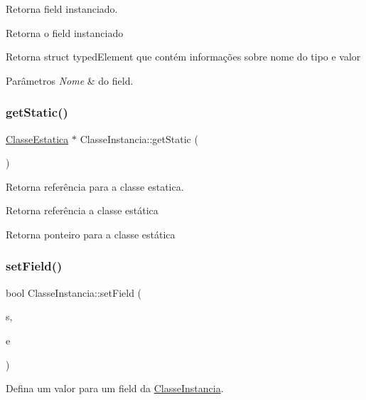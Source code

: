 Retorna field instanciado. 

Retorna o field instanciado \begin{DoxyReturn}{Retorna}
struct typed\+Element que contém informações sobre nome do tipo e valor
\end{DoxyReturn}

\begin{DoxyParams}{Parâmetros}
{\em Nome} & do field. \\
\hline
\end{DoxyParams}
\mbox{\label{classClasseInstancia_afd5b88bd863678ab6744641ed96a1107}} 
\subsubsection{\texorpdfstring{get\+Static()}{getStatic()}}
{\footnotesize\ttfamily \hyperlink{classClasseEstatica}{Classe\+Estatica} $\ast$ Classe\+Instancia\+::get\+Static (\begin{DoxyParamCaption}{ }\end{DoxyParamCaption})}



Retorna referência para a classe estatica. 

Retorna referência a classe estática \begin{DoxyReturn}{Retorna}
ponteiro para a classe estática 
\end{DoxyReturn}
\mbox{\label{classClasseInstancia_a468e473bc4fc726d72d0824ca92d5504}} 
\subsubsection{\texorpdfstring{set\+Field()}{setField()}}
{\footnotesize\ttfamily bool Classe\+Instancia\+::set\+Field (\begin{DoxyParamCaption}\item[{string}]{s,  }\item[{\hyperlink{structtypedElement__s}{typed\+Element}}]{e }\end{DoxyParamCaption})}



Defina um valor para um field da \hyperlink{classClasseInstancia}{Classe\+Instancia}. 

